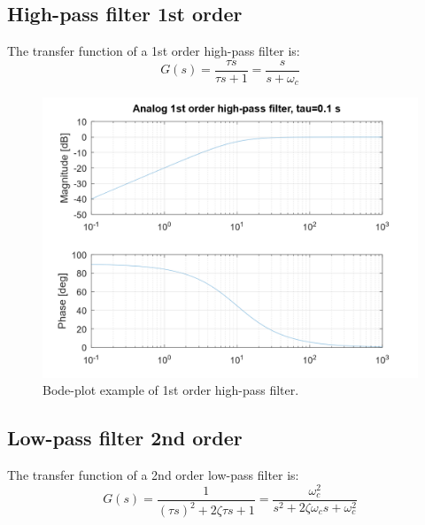 \documentclass[]{book}
\begin{document}
\hypertarget{high-pass-filter-1st-order}{%
\subsection{High-pass filter 1st order}\label{high-pass-filter-1st-order}}

The transfer function of a 1st order high-pass filter is:
\[
G(s) =  \frac{\tau s}{\tau s + 1} = \frac{s}{s + \omega_c}
\label{eq:hpf1}
\]

\begin{figure}
\includegraphics[width=1\linewidth]{images/filters/hpf_1st} \caption{Bode-plot example of 1st order high-pass filter.}\label{fig:unnamed-chunk-2}
\end{figure}

\hypertarget{low-pass-filter-2nd-order}{%
\subsection{Low-pass filter 2nd order}\label{low-pass-filter-2nd-order}}

The transfer function of a 2nd order low-pass filter is:
\[
G(s) =  \frac{1}{(\tau s)^2 + 2\zeta \tau s + 1} = \frac{\omega_c^2}{s^2 + 2\zeta \omega_c s + \omega_c^2}
\label{eq:lpf2}
\]
\end{document}
